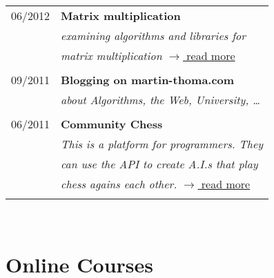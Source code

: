 \documentclass[a4paper,10pt]{article} %
\begin{document}
{\begin{minipage}[t]{0.44\textwidth}
\begin{tabular}{rl}
06/2012	 & \textbf{Matrix multiplication}\\
& \textit{examining algorithms and libraries for}\\
& \textit{matrix multiplication} \hfill \href{http://martin-thoma.com/matrix-multiplication-python-java-cpp/}{$\rightarrow$ read more}\\\\

09/2011	 & \textbf{Blogging on martin-thoma.com}\\
& \textit{about Algorithms, the Web, University, \dots}\\ \\


06/2011	 & \textbf{Community Chess}\\
& \textit{This is a platform for programmers. They}\\
& \textit{can use the API to create A.I.s that play}\\
& \textit{chess agains each other. } \hfill \href{https://github.com/MartinThoma/community-chess}{$\rightarrow$ read more}\\\\
\end{tabular}\\[10pt]


\section{Online Courses} 


\end{minipage}}
\end{document}
